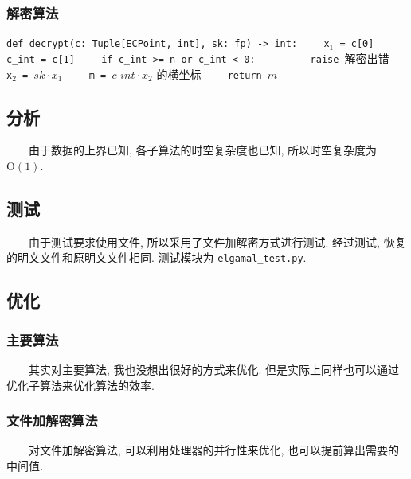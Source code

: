 \documentclass[12pt,a4paper]{article}
\begin{document}
\subsubsection*{解密算法}
\lstinline{def decrypt(c: Tuple[ECPoint, int], sk: fp) -> int:}
\newline
\lstinline{    x}$_1$\lstinline{ = c[0]}
\newline
\lstinline{    c_int = c[1]}
\newline
\lstinline{    if c_int >= n or c_int < 0:}
\newline
\lstinline{         raise }解密出错
\newline
\lstinline{    x}$_2$\lstinline{ = }$ sk \cdot x_1$
\newline
\lstinline{    m = }$c\mathit{\_}int \cdot x_2$ 的横坐标
\newline
\lstinline{    return }$ m $

\subsection*{分析}

　　由于数据的上界已知, 各子算法的时空复杂度也已知, 所以时空复杂度为 $ \mathrm{O}(1) $. 

\subsection*{测试}

　　由于测试要求使用文件, 所以采用了文件加解密方式进行测试. 经过测试, 恢复的明文文件和原明文文件相同. 测试模块为 \verb|elgamal_test.py|.

\subsection*{优化}

\subsubsection*{主要算法}

　　其实对主要算法, 我也没想出很好的方式来优化. 但是实际上同样也可以通过优化子算法来优化算法的效率. 

\subsubsection*{文件加解密算法}

　　对文件加解密算法, 可以利用处理器的并行性来优化, 也可以提前算出需要的中间值. 
\end{document}
